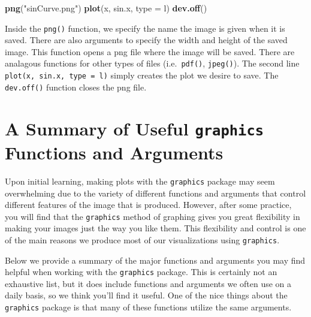 \documentclass[
]{krantz}
\newenvironment{Shaded}{\begin{snugshade}}{\end{snugshade}}
\newcommand{\DataTypeTok}[1]{\textcolor[rgb]{0.13,0.29,0.53}{#1}}
\newcommand{\KeywordTok}[1]{\textcolor[rgb]{0.13,0.29,0.53}{\textbf{#1}}}
\newcommand{\NormalTok}[1]{#1}
\newcommand{\StringTok}[1]{\textcolor[rgb]{0.31,0.60,0.02}{#1}}
\begin{document}
\begin{Shaded}
\begin{Highlighting}[]
\KeywordTok{png}\NormalTok{(}\StringTok{"sinCurve.png"}\NormalTok{)}
\KeywordTok{plot}\NormalTok{(x, sin.x, }\DataTypeTok{type =} \StringTok{\textquotesingle{}l\textquotesingle{}}\NormalTok{)}
\KeywordTok{dev.off}\NormalTok{()}
\end{Highlighting}
\end{Shaded}

Inside the \texttt{png()} function, we specify the name the image is given when it is saved. There are also arguments to specify the width and height of the saved image. This function opens a png file where the image will be saved. There are analagous functions for other types of files (i.e.~\texttt{pdf()}, \texttt{jpeg()}). The second line \texttt{plot(x,\ sin.x,\ type\ =\ \textquotesingle{}l\textquotesingle{})} simply creates the plot we desire to save. The \texttt{dev.off()} function closes the png file.

\hypertarget{graphics13}{%
\section{\texorpdfstring{A Summary of Useful \texttt{graphics} Functions and Arguments}{A Summary of Useful graphics Functions and Arguments}}\label{graphics13}}

Upon initial learning, making plots with the \texttt{graphics} package may seem overwhelming due to the variety of different functions and arguments that control different features of the image that is produced. However, after some practice, you will find that the \texttt{graphics} method of graphing gives you great flexibility in making your images just the way you like them. This flexibility and control is one of the main reasons we produce most of our visualizations using \texttt{graphics}.

Below we provide a summary of the major functions and arguments you may find helpful when working with the \texttt{graphics} package. This is certainly not an exhaustive list, but it does include functions and arguments we often use on a daily basis, so we think you'll find it useful. One of the nice things about the \texttt{graphics} package is that many of these functions utilize the same arguments.
\end{document}
